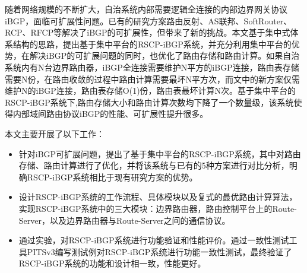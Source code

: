 \begin{cabstract}
  随着网络规模的不断扩大，自治系统内部需要逻辑全连接的内部边界网关协议iBGP，面临可扩展性问题。已有的研究方案路由反射、AS联邦、SoftRouter、RCP、RFCP等解决了iBGP的可扩展性，但带来了新的挑战。本文基于集中式体系结构的思路，提出基于集中平台的RSCP-iBGP系统，并充分利用集中平台的优势，在解决iBGP的可扩展问题的同时，也优化了路由存储和路由计算。如果自治系统内有N台边界路由器，iBGP全连接需要维护N平方的iBGP连接，路由表存储需要N份，在路由收敛的过程中路由计算需要最坏N平方次，而文中的新方案仅需维护N的iBGP连接，路由表存储O(1)份，路由表最坏计算N次。基于集中平台的RSCP-iBGP系统下,路由存储大小和路由计算次数均下降了一个数量级，该系统使得内部域间路由协议iBGP的性能、可扩展性提升很多。

  本文主要开展了以下工作：
  \begin{itemize}
    \item 针对iBGP可扩展问题，提出了基于集中平台的RSCP-iBGP系统，其中对路由存储、路由计算进行了优化，并将该系统与已有的5种方案进行对比分析，明确RSCP-iBGP系统相比于现有研究方案的优势。
    \item 设计RSCP-iBGP系统的工作流程、具体模块以及复式的最优路由计算算法，实现RSCP-iBGP系统中的三大模块：边界路由器，路由控制平台上的Route-Server，以及边界路由器与Route-Server之间的通信协议。
    \item 通过实验，对RSCP-iBGP系统进行功能验证和性能评价。通过一致性测试工具PITSv3编写测试例对RSCP-iBGP系统进行功能一致性测试，最终验证了RSCP-iBGP系统的功能和设计相一致，性能更好。
  \end{itemize}

\end{cabstract}


